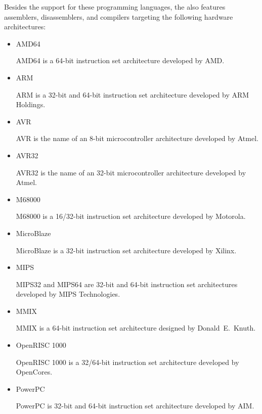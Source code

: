 Besides the support for these programming languages, the \ecs{} also features assemblers, disassemblers, and compilers targeting the following hardware architectures:

\begin{itemize}

\item AMD64\nopagebreak

AMD64 is a 64-bit instruction set architecture developed by AMD\@.
\seeamd

\item ARM\nopagebreak

ARM is a 32-bit and 64-bit instruction set architecture developed by ARM Holdings.
\seearm

\item AVR\nopagebreak

AVR is the name of an 8-bit microcontroller architecture developed by Atmel.
\seeavr

\item AVR32\nopagebreak

AVR32 is the name of an 32-bit microcontroller architecture developed by Atmel.
\seeavrtt

\item M68000\nopagebreak

M68000 is a 16/32-bit instruction set architecture developed by Motorola.
\seemabk

\item MicroBlaze\nopagebreak

MicroBlaze is a 32-bit instruction set architecture developed by Xilinx.
\seemibl

\item MIPS\nopagebreak

MIPS32 and MIPS64 are 32-bit and 64-bit instruction set architectures developed by MIPS Technologies.
\seemips

\item MMIX\nopagebreak

MMIX is a 64-bit instruction set architecture designed by Donald~E.\ Knuth.
\seemmix

\item OpenRISC 1000\nopagebreak

OpenRISC 1000 is a 32/64-bit instruction set architecture developed by OpenCores.
\seeorok

\item PowerPC\nopagebreak

PowerPC is 32-bit and 64-bit instruction set architecture developed by AIM\@.
\seeppc


\end{itemize}
